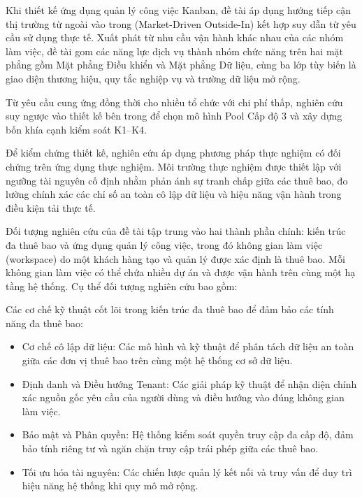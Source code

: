 Khi thiết kế ứng dụng quản lý công việc Kanban, đề tài áp dụng hướng tiếp cận thị trường từ ngoài vào trong (Market-Driven Outside-In) kết hợp suy dẫn từ yêu cầu sử dụng thực tế. Xuất phát từ nhu cầu vận hành khác nhau của các nhóm làm việc, đề tài gom các năng lực dịch vụ thành nhóm chức năng trên hai mặt phẳng gồm Mặt phẳng Điều khiển và Mặt phẳng Dữ liệu, cùng ba lớp tùy biến là giao diện thương hiệu, quy tắc nghiệp vụ và trường dữ liệu mở rộng.

Từ yêu cầu cung ứng đồng thời cho nhiều tổ chức với chi phí thấp, nghiên cứu suy ngược vào thiết kế bên trong để chọn mô hình Pool Cấp độ 3 và xây dựng bốn khía cạnh kiểm soát K1--K4.

Để kiểm chứng thiết kế, nghiên cứu áp dụng phương pháp thực nghiệm có đối chứng trên ứng dụng thực nghiệm. Môi trường thực nghiệm được thiết lập với ngưỡng tài nguyên cố định nhằm phản ánh sự tranh chấp giữa các thuê bao, đo lường chính xác các chỉ số an toàn cô lập dữ liệu và hiệu năng vận hành trong điều kiện tải thực tế.

\label{v4-intro-5}

Đối tượng nghiên cứu của đề tài tập trung vào hai thành phần chính: kiến trúc đa thuê bao và ứng dụng quản lý công việc, trong đó không gian làm việc (workspace) do một khách hàng tạo và quản lý được xác định là thuê bao. Mỗi không gian làm việc có thể chứa nhiều dự án và được vận hành trên cùng một hạ tầng hệ thống. Cụ thể đối tượng nghiên cứu bao gồm:

Các cơ chế kỹ thuật cốt lõi trong kiến trúc đa thuê bao để đảm bảo các tính năng đa thuê bao:

\begin{itemize}
\item
  Cơ chế cô lập dữ liệu: Các mô hình và kỹ thuật để phân tách dữ liệu an toàn giữa các đơn vị thuê bao trên cùng một hệ thống cơ sở dữ liệu.
\item
  Định danh và Điều hướng Tenant: Các giải pháp kỹ thuật để nhận diện chính xác nguồn gốc yêu cầu của người dùng và điều hướng vào đúng không gian làm việc.
\item
  Bảo mật và Phân quyền: Hệ thống kiểm soát quyền truy cập đa cấp độ, đảm bảo tính riêng tư và ngăn chặn truy cập trái phép giữa các thuê bao.
\item
  Tối ưu hóa tài nguyên: Các chiến lược quản lý kết nối và truy vấn để duy trì hiệu năng hệ thống khi quy mô mở rộng.
\end{itemize}

